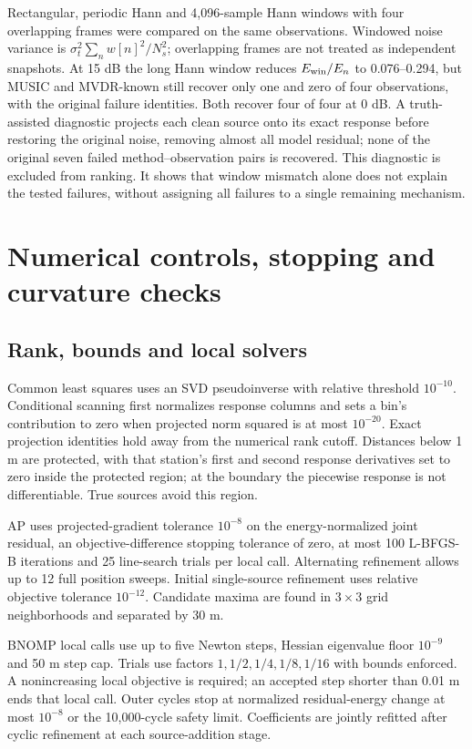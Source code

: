 \documentclass[a4paper,12pt,review]{cas-sc}
\begin{document}
Rectangular, periodic Hann and 4,096-sample Hann windows with four overlapping frames were compared on the same observations. Windowed noise variance is $\sigma_t^2\sum_n w[n]^2/N_s^2$; overlapping frames are not treated as independent snapshots. At 15 dB the long Hann window reduces $E_{\rm win}/E_n$ to 0.076--0.294, but MUSIC and MVDR-known still recover only one and zero of four observations, with the original failure identities. Both recover four of four at 0 dB. A truth-assisted diagnostic projects each clean source onto its exact response before restoring the original noise, removing almost all model residual; none of the original seven failed method--observation pairs is recovered. This diagnostic is excluded from ranking. It shows that window mismatch alone does not explain the tested failures, without assigning all failures to a single remaining mechanism.

\section{Numerical controls, stopping and curvature checks}
\subsection{Rank, bounds and local solvers}
Common least squares uses an SVD pseudoinverse with relative threshold $10^{-10}$. Conditional scanning first normalizes response columns and sets a bin's contribution to zero when projected norm squared is at most $10^{-20}$. Exact projection identities hold away from the numerical rank cutoff. Distances below 1 m are protected, with that station's first and second response derivatives set to zero inside the protected region; at the boundary the piecewise response is not differentiable. True sources avoid this region.

AP uses projected-gradient tolerance $10^{-8}$ on the energy-normalized joint residual, an objective-difference stopping tolerance of zero, at most 100 L-BFGS-B iterations and 25 line-search trials per local call. Alternating refinement allows up to 12 full position sweeps. Initial single-source refinement uses relative objective tolerance $10^{-12}$. Candidate maxima are found in $3\times3$ grid neighborhoods and separated by 30 m.

BNOMP local calls use up to five Newton steps, Hessian eigenvalue floor $10^{-9}$ and 50 m step cap. Trials use factors $1,1/2,1/4,1/8,1/16$ with bounds enforced. A nonincreasing local objective is required; an accepted step shorter than 0.01 m ends that local call. Outer cycles stop at normalized residual-energy change at most $10^{-8}$ or the 10,000-cycle safety limit. Coefficients are jointly refitted after cyclic refinement at each source-addition stage.
\end{document}
